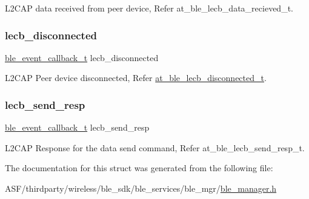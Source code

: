 L2\+C\+AP data received from peer device, Refer at\+\_\+ble\+\_\+lecb\+\_\+data\+\_\+recieved\+\_\+t. 

\mbox{\label{structble__l2cap__event__cb_a2bb3a4d79951fc2f85085cde5b2b8da0}} 
\subsubsection{\texorpdfstring{lecb\_disconnected}{lecb\_disconnected}}
{\footnotesize\ttfamily \mbox{\hyperlink{ble__manager_8h_a04ce4bb8cb8282f2762e3924b1773cc9}{ble\+\_\+event\+\_\+callback\+\_\+t}} lecb\+\_\+disconnected}



L2\+C\+AP Peer device disconnected, Refer \mbox{\hyperlink{structat__ble__lecb__disconnected__t}{at\+\_\+ble\+\_\+lecb\+\_\+disconnected\+\_\+t}}. 

\mbox{\label{structble__l2cap__event__cb_a4076300513afab41a4e27ee73b9180b7}} 
\subsubsection{\texorpdfstring{lecb\_send\_resp}{lecb\_send\_resp}}
{\footnotesize\ttfamily \mbox{\hyperlink{ble__manager_8h_a04ce4bb8cb8282f2762e3924b1773cc9}{ble\+\_\+event\+\_\+callback\+\_\+t}} lecb\+\_\+send\+\_\+resp}



L2\+C\+AP Response for the data send command, Refer at\+\_\+ble\+\_\+lecb\+\_\+send\+\_\+resp\+\_\+t. 



The documentation for this struct was generated from the following file\+:\begin{DoxyCompactItemize}
\item 
A\+S\+F/thirdparty/wireless/ble\+\_\+sdk/ble\+\_\+services/ble\+\_\+mgr/\mbox{\hyperlink{ble__manager_8h}{ble\+\_\+manager.\+h}}\end{DoxyCompactItemize}
